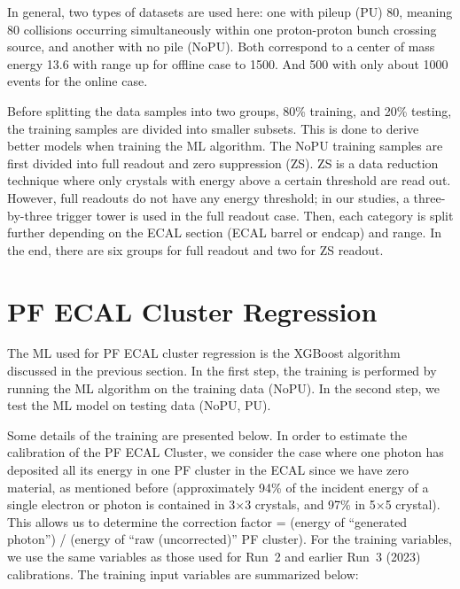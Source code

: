 In general, two types of datasets are used here: one with pileup (PU) 80, meaning 80 collisions occurring simultaneously within one proton-proton bunch crossing source,
and another with no pile (NoPU).
Both correspond to a center of mass energy 13.6 \TeV with \pt range up for offline case to 1500\GeV{}. And 500\GeV{} with only about 1000 events for the online case.

Before splitting the data samples into two groups, 80\% training, and 20\% testing, the training samples are divided into smaller subsets.
This is done to derive better models when training the ML algorithm.
The NoPU training samples are first divided into full readout and zero suppression (ZS).
ZS is a data reduction technique where only crystals with energy above a certain threshold are read out.
However, full readouts do not have any energy threshold; in our studies, a three-by-three trigger tower is used in the full readout case.
Then, each category is split further depending on the ECAL section (ECAL barrel or endcap) and \pt range. In the end, there are six groups for full readout and two for ZS readout. 


\section{PF ECAL Cluster Regression}
The ML used for PF ECAL cluster regression is the XGBoost algorithm discussed in the previous section.
In the first step, the training is performed by running the ML algorithm on the training data (NoPU).
In the second step, we test the ML model on testing data (NoPU, PU).

Some details of the training are presented below. In order to estimate the calibration of the PF ECAL Cluster,
we consider the case where one photon has deposited all its energy in one PF cluster in the ECAL since we have zero material,
as mentioned before (approximately 94\% of the incident energy of a single electron or photon is contained in 3$\times$3 crystals, and 97\% in 5$\times$5 crystal).
This allows us to determine the correction factor = (energy of ``generated photon'') / (energy of ``raw (uncorrected)'' PF cluster).
For the training variables, we use the same variables as those used for Run~2 and earlier Run~3 (2023) calibrations. The training input variables are summarized below:

